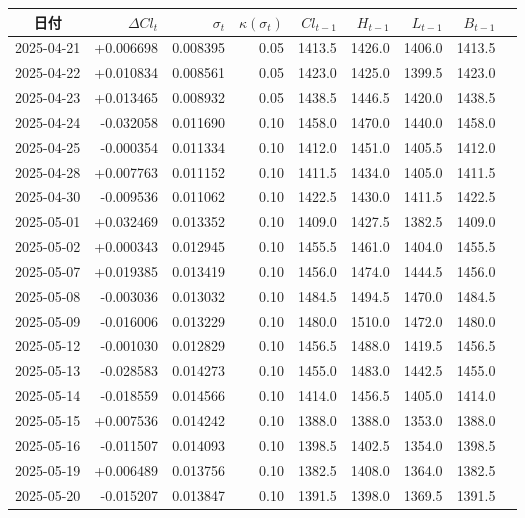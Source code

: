 \begin{tabularx}{\textwidth}{@{}c r r r r r r r r@{}}
\toprule
日付 & $\Delta Cl_t$ & $\sigma_t$ & $\kappa(\sigma_t)$ & $Cl_{t-1}$ & $H_{t-1}$ & $L_{t-1}$ & $B_{t-1}$\\
\midrule
2025-04-21 & +0.006698 & 0.008395 & 0.05 & 1413.5 & 1426.0 & 1406.0 & 1413.5\\
2025-04-22 & +0.010834 & 0.008561 & 0.05 & 1423.0 & 1425.0 & 1399.5 & 1423.0\\
2025-04-23 & +0.013465 & 0.008932 & 0.05 & 1438.5 & 1446.5 & 1420.0 & 1438.5\\
2025-04-24 & -0.032058 & 0.011690 & 0.10 & 1458.0 & 1470.0 & 1440.0 & 1458.0\\
2025-04-25 & -0.000354 & 0.011334 & 0.10 & 1412.0 & 1451.0 & 1405.5 & 1412.0\\
2025-04-28 & +0.007763 & 0.011152 & 0.10 & 1411.5 & 1434.0 & 1405.0 & 1411.5\\
2025-04-30 & -0.009536 & 0.011062 & 0.10 & 1422.5 & 1430.0 & 1411.5 & 1422.5\\
2025-05-01 & +0.032469 & 0.013352 & 0.10 & 1409.0 & 1427.5 & 1382.5 & 1409.0\\
2025-05-02 & +0.000343 & 0.012945 & 0.10 & 1455.5 & 1461.0 & 1404.0 & 1455.5\\
2025-05-07 & +0.019385 & 0.013419 & 0.10 & 1456.0 & 1474.0 & 1444.5 & 1456.0\\
2025-05-08 & -0.003036 & 0.013032 & 0.10 & 1484.5 & 1494.5 & 1470.0 & 1484.5\\
2025-05-09 & -0.016006 & 0.013229 & 0.10 & 1480.0 & 1510.0 & 1472.0 & 1480.0\\
2025-05-12 & -0.001030 & 0.012829 & 0.10 & 1456.5 & 1488.0 & 1419.5 & 1456.5\\
2025-05-13 & -0.028583 & 0.014273 & 0.10 & 1455.0 & 1483.0 & 1442.5 & 1455.0\\
2025-05-14 & -0.018559 & 0.014566 & 0.10 & 1414.0 & 1456.5 & 1405.0 & 1414.0\\
2025-05-15 & +0.007536 & 0.014242 & 0.10 & 1388.0 & 1388.0 & 1353.0 & 1388.0\\
2025-05-16 & -0.011507 & 0.014093 & 0.10 & 1398.5 & 1402.5 & 1354.0 & 1398.5\\
2025-05-19 & +0.006489 & 0.013756 & 0.10 & 1382.5 & 1408.0 & 1364.0 & 1382.5\\
2025-05-20 & -0.015207 & 0.013847 & 0.10 & 1391.5 & 1398.0 & 1369.5 & 1391.5\\

\end{tabularx}
